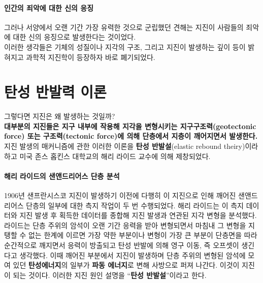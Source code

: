 \documentclass[12pt, a4paper, oneside]{book}
\begin{document}
		\paragraph{인간의 죄악에 대한 신의 응징}
		그러나 서양에서 오랜 기간 가장 유력한 것으로 군립했던 견해는 지진이 사람들의 죄악에 대한 신의 응징으로 발생한다는 것이었다. \\
		
		이러한 생각들은 기체의 성질이나 지각의 구조, 그리고 지진이 발생하는 깊이 등이 밝혀지고 과학적 지진학이 등장하자 바로 폐기되었다.
		

	\clearpage
	\section{탄성 반발력 이론}
	
	그렇다면 지진은 왜 발생하는 것일까? \\
	
		\textbf{대부분의 지진들은 지구 내부에 작용해 지각을 변형시키는 
		지구구조력(geotectonic force) 또는 구조력(tectonic force)에 의해 단층에서 지층이 깨어지면서 발생한다.} \\
	
		지진 발생의 매커니즘에 관한 이러한 이론을 \textbf{탄성 반발설}(elastic rebound theiry)이라 하고 
		미국 존스 홉킨스 대학교의 해리 라이드 교수에 의해 제창되었다.

		\paragraph{해리 라이드의 샌앤드리어스 단층 분석}
		1906년 샌프란시스코 지진이 발생하기 이전에 
		다행히 이 지진으로 인해 깨어진 샌앤드리어스 단층의 일부에 대한 측지 작업이 두 번 수행되었다.
		해리 라이드는 이 측지 데이터와 지진 발생 후 획득한 데이터를 종합해 지진 발생과 연관된 지각 변형을 분석했다. \\
		
		라이드는 단층 주위의 암석이 오랜 기간 응력을 받아 변형되면서 
		마침내 그 변형을 지탱할 수 없는 한계에 이르면 
		가장 약한 부분이나 변형이 가장 큰 부분이 단층면을 따라 순간적으로 깨지면서 응력이 방출되고 
		탄성 반발에 의해 영구 이동, 즉 오프셋이 생긴다고 생각했다.
		이때 깨어진 부분에서 지진이 발생하며 
		단층 주위의 변형된 암석에 모여 있던 \textbf{탄성에너지}의 일부가 
		\textbf{파동 에너지}로 변해 사방으로 퍼져 나간다.
		이것이 지진이 되는 것이다.
		이러한 지진 원인 설명을 ``\textbf{탄성 반발설}''이라고 한다. \\
		
\end{document}
